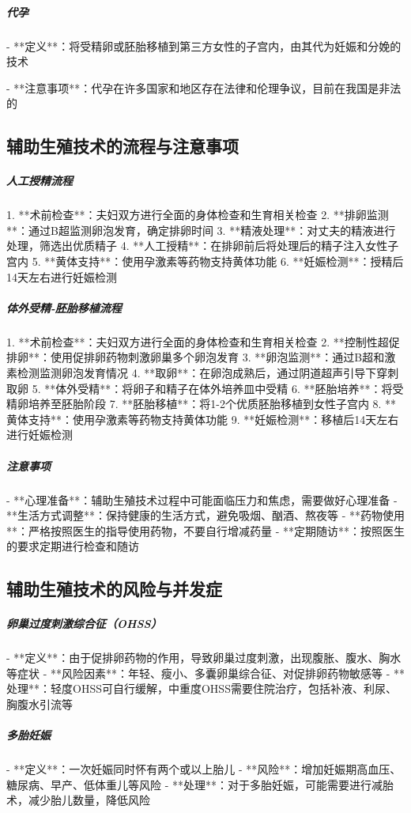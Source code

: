 \begin{enumerate}
\subparagraph{代孕}

- **定义**：将受精卵或胚胎移植到第三方女性的子宫内，由其代为妊娠和分娩的技术

- **注意事项**：代孕在许多国家和地区存在法律和伦理争议，目前在我国是非法的

\subsection{辅助生殖技术的流程与注意事项}

\subparagraph{人工授精流程}

1. **术前检查**：夫妇双方进行全面的身体检查和生育相关检查
2. **排卵监测**：通过B超监测卵泡发育，确定排卵时间
3. **精液处理**：对丈夫的精液进行处理，筛选出优质精子
4. **人工授精**：在排卵前后将处理后的精子注入女性子宫内
5. **黄体支持**：使用孕激素等药物支持黄体功能
6. **妊娠检测**：授精后14天左右进行妊娠检测

\subparagraph{体外受精-胚胎移植流程}

1. **术前检查**：夫妇双方进行全面的身体检查和生育相关检查
2. **控制性超促排卵**：使用促排卵药物刺激卵巢多个卵泡发育
3. **卵泡监测**：通过B超和激素检测监测卵泡发育情况
4. **取卵**：在卵泡成熟后，通过阴道超声引导下穿刺取卵
5. **体外受精**：将卵子和精子在体外培养皿中受精
6. **胚胎培养**：将受精卵培养至胚胎阶段
7. **胚胎移植**：将1-2个优质胚胎移植到女性子宫内
8. **黄体支持**：使用孕激素等药物支持黄体功能
9. **妊娠检测**：移植后14天左右进行妊娠检测

\subparagraph{注意事项}

- **心理准备**：辅助生殖技术过程中可能面临压力和焦虑，需要做好心理准备
- **生活方式调整**：保持健康的生活方式，避免吸烟、酗酒、熬夜等
- **药物使用**：严格按照医生的指导使用药物，不要自行增减药量
- **定期随访**：按照医生的要求定期进行检查和随访

\subsection{辅助生殖技术的风险与并发症}

\subparagraph{卵巢过度刺激综合征（OHSS）}

- **定义**：由于促排卵药物的作用，导致卵巢过度刺激，出现腹胀、腹水、胸水等症状
- **风险因素**：年轻、瘦小、多囊卵巢综合征、对促排卵药物敏感等
- **处理**：轻度OHSS可自行缓解，中重度OHSS需要住院治疗，包括补液、利尿、胸腹水引流等

\subparagraph{多胎妊娠}

- **定义**：一次妊娠同时怀有两个或以上胎儿
- **风险**：增加妊娠期高血压、糖尿病、早产、低体重儿等风险
- **处理**：对于多胎妊娠，可能需要进行减胎术，减少胎儿数量，降低风险


\end{enumerate}
